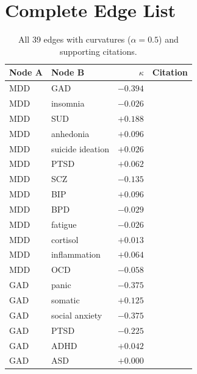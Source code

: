 \documentclass{article}
\begin{document}



\clearpage
\appendix

\section{Complete Edge List}
\label{app:edgelist}

\begin{table}[h]
\centering
\caption{All 39 edges with curvatures ($\alpha = 0.5$) and supporting citations.}
\label{tab:edgelist}
\footnotesize
\begin{tabular}{llrl}
\toprule
Node A & Node B & $\kappa$ & Citation \\
\midrule
MDD & GAD & $-0.394$ & \citep{kessler2005prevalence, moffitt2007generalized} \\
MDD & insomnia & $-0.026$ & \citep{baglioni2011insomnia} \\
MDD & SUD & $+0.188$ & \citep{davis2008major} \\
MDD & anhedonia & $+0.096$ & \citep{pizzagalli2014depression} \\
MDD & suicide ideation & $+0.026$ & \citep{nock2008cross} \\
MDD & PTSD & $+0.062$ & \citep{flory2015comorbidity} \\
MDD & SCZ & $-0.135$ & \citep{buckley2009psychiatric} \\
MDD & BIP & $+0.096$ & \citep{hirschfeld2003differential} \\
MDD & BPD & $-0.029$ & \citep{gunderson2008major} \\
MDD & fatigue & $-0.026$ & \citep{demyttenaere2005many} \\
MDD & cortisol & $+0.013$ & \citep{pariante2008hpa} \\
MDD & inflammation & $+0.064$ & \citep{dowlati2010meta} \\
MDD & OCD & $-0.058$ & \citep{brakoulias2017comorbidity} \\
GAD & panic & $-0.375$ & \citep{brown2001current} \\
GAD & somatic & $+0.125$ & \citep{kroenke2007anxiety} \\
GAD & social anxiety & $-0.375$ & \citep{mennin2008role} \\
GAD & PTSD & $-0.225$ & \citep{ginzburg2010comorbidity} \\
GAD & ADHD & $+0.042$ & \citep{kessler2006prevalence} \\
GAD & ASD & $+0.000$ & \citep{vansteensel2011anxiety} \\

\end{tabular}
\end{table}
\end{document}
